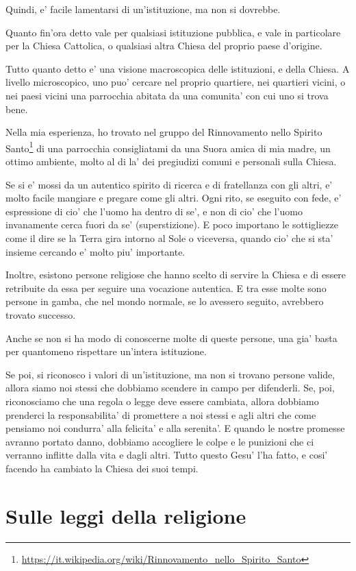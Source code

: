 Quindi, e' facile lamentarsi di un'istituzione, ma non si dovrebbe.

Quanto fin'ora detto vale per qualsiasi istituzione pubblica, e vale in particolare per la Chiesa Cattolica, o qualsiasi altra Chiesa del proprio paese d'origine.

Tutto quanto detto e' una visione macroscopica delle istituzioni, e della Chiesa. A livello microscopico, uno puo' cercare nel proprio quartiere, nei quartieri vicini, o nei paesi vicini una parrocchia abitata da una comunita' con cui uno si trova bene.

Nella mia esperienza, ho trovato nel gruppo del Rinnovamento nello Spirito Santo\footnote{\url{https://it.wikipedia.org/wiki/Rinnovamento\_nello\_Spirito\_Santo}} di una parrocchia consigliatami da una Suora amica di mia madre, un ottimo ambiente, molto al di la' dei pregiudizi comuni e personali sulla Chiesa.

Se si e' mossi da un autentico spirito di ricerca e di fratellanza con gli altri, e' molto facile mangiare e pregare come gli altri. Ogni rito, se eseguito con fede, e' espressione di cio' che l'uomo ha dentro di se', e non di cio' che l'uomo invanamente cerca fuori da se' (superstizione). E poco importano le sottigliezze come il dire se la Terra gira intorno al Sole o viceversa, quando cio' che si sta' insieme cercando e' molto piu' importante.

Inoltre, esistono persone religiose che hanno scelto di servire la Chiesa e di essere retribuite da essa per seguire una vocazione autentica. E tra esse molte sono persone in gamba, che nel mondo normale, se lo avessero seguito, avrebbero trovato successo.

Anche se non si ha modo di conoscerne molte di queste persone, una gia' basta per quantomeno rispettare un'intera istituzione.

Se poi, si riconosco i valori di un'istituzione, ma non si trovano persone valide, allora siamo noi stessi che dobbiamo scendere in campo per difenderli. Se, poi, riconosciamo che una regola o legge deve essere cambiata, allora dobbiamo prenderci la responsabilita' di promettere a noi stessi e agli altri che come pensiamo noi condurra' alla felicita' e alla serenita'. E quando le nostre promesse avranno portato danno, dobbiamo accogliere le colpe e le punizioni che ci verranno inflitte dalla vita e dagli altri. Tutto questo Gesu' l'ha fatto, e cosi' facendo ha cambiato la Chiesa dei suoi tempi. 

\section{Sulle leggi della religione}

